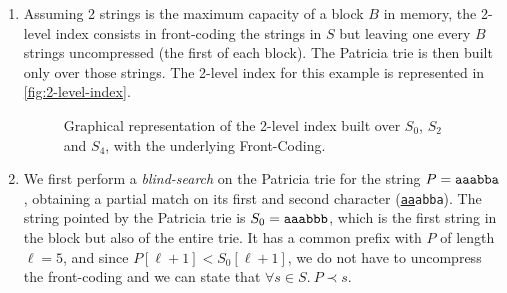 \begin{enumerate}
  \item Assuming 2 strings is the maximum capacity of a block $B$ in memory, the
  2-level index consists in front-coding the strings in $S$ but leaving one
  every $B$ strings uncompressed (the first of each block). The Patricia trie is
  then built only over those strings. The 2-level index for this example is
  represented in \autoref{fig:2-level-index}.
  \begin{figure}[t]
    \centering

    \caption{Graphical representation of the 2-level index built over $S_0$,
    $S_2$ and $S_4$, with the underlying Front-Coding.}

    \label{fig:2-level-index}
  \end{figure}

  \item We first perform a \emph{blind-search} on the Patricia trie for the
  string $P = \text{\tt aaabba}$, obtaining a partial match on its first and
  second character ({\tt \underline{aa}abba}). The string pointed by the
  Patricia trie is $S_0 = \text{\tt aaabbb}$, which is the first string in the
  block but also of the entire trie. It has a common prefix with $P$ of length
  $\ell = 5$, and since $P[\ell + 1] < S_0[\ell + 1]$, we do not have to
  uncompress the front-coding and we can state that $\forall s \in S.\ P \prec
  s$.

\end{enumerate}

